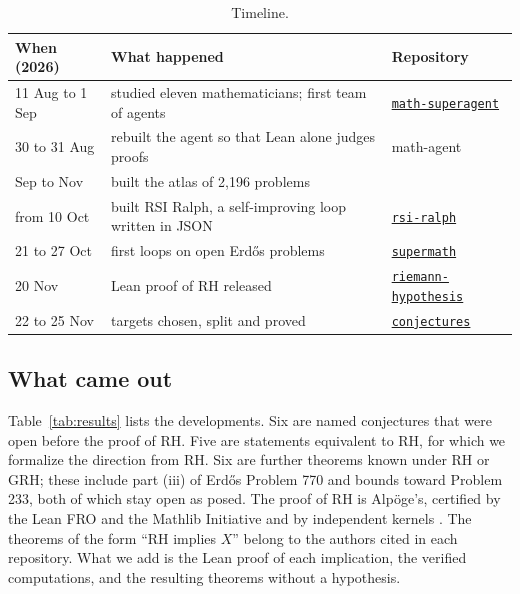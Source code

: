 \documentclass[11pt]{amsart}
\newcommand{\repo}[1]{\href{https://github.com/senamakel/#1}{\texttt{#1}}}
\newcommand{\trepo}[1]{\href{https://github.com/tinyhumansai/#1}{\texttt{#1}}}
\begin{document}
\begin{table}[ht]
\small
\begin{tabular}{@{}lll@{}}
\toprule
When (2026) & What happened & Repository\\
\midrule
11 Aug to 1 Sep & studied eleven mathematicians; first team of agents & \repo{math-superagent} \cite{superagent}\\
30 to 31 Aug & rebuilt the agent so that Lean alone judges proofs & math-agent\\
Sep to Nov & built the atlas of 2{,}196 problems & \\
from 10 Oct & built RSI Ralph, a self-improving loop written in JSON & \trepo{rsi-ralph} \cite{rsiralph}\\
21 to 27 Oct & first loops on open Erd\H{o}s problems & \trepo{supermath} \cite{supermath}\\
20 Nov & Lean proof of RH released & \href{https://github.com/leanprover-community/riemann-hypothesis}{\texttt{riemann-hypothesis}} \cite{rhrepo}\\
22 to 25 Nov & targets chosen, split and proved & \href{https://github.com/ChatAndBuild/conjectures}{\texttt{conjectures}} \cite{conjectures}\\
\bottomrule
\end{tabular}
\medskip
\caption{Timeline.}\label{tab:time}
\end{table}

\subsection*{What came out} Table~\ref{tab:results} lists the developments. Six are named conjectures that were open before the proof of RH. Five are statements equivalent to RH, for which we formalize the direction from RH. Six are further theorems known under RH or GRH; these include part (iii) of Erd\H{o}s Problem 770 and bounds toward Problem 233, both of which stay open as posed. The proof of RH is Alp\"oge's, certified by the Lean FRO and the Mathlib Initiative \cite{leanfro} and by independent kernels \cite{sutherland}. The theorems of the form ``RH implies $X$'' belong to the authors cited in each repository. What we add is the Lean proof of each implication, the verified computations, and the resulting theorems without a hypothesis.
\end{document}
